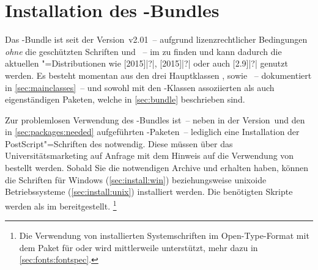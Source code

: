 \section{Installation des \TUDScript-Bundles}
%
%
%
%
%
Das \TUDScript-Bundle ist seit der Version~v2.01~-- aufgrund lizenzrechtlicher 
Bedingungen \emph{ohne} die geschützten Schriften \Univers und \DIN~-- im \CTAN
zu finden und kann dadurch die aktuellen "=Distributionen wie 
[2015]|?|, 
[2015]|?| oder auch
[2.9]|?| genutzt werden. Es besteht momentan aus 
den drei Hauptklassen ,  sowie 
~-- dokumentiert in \autoref{sec:mainclasses}~-- und sowohl 
mit den \TUDScript-Klassen assoziierten als auch eigenständigen Paketen, welche 
in \autoref{sec:bundle} beschrieben sind.

Zur problemlosen Verwendung des \TUDScript-Bundles ist~-- neben \KOMAScript{} in
der Version~\vKOMAScript und den in \autoref{sec:packages:needed} aufgeführten 
-Paketen~-- lediglich eine Installation der PostScript"=Schriften 
des \TUDCDs notwendig. Diese müssen über das Universitätsmarketing auf 
%
{Anfrage} mit dem Hinweis auf die Verwendung von  bestellt 
werden. Sobald Sie die notwendigen Archive  und 
 erhalten haben, können die Schriften für Windows 
(\autoref{sec:install:win}) beziehungsweise unixoide Betriebssysteme 
(\autoref{sec:install:unix}) installiert werden. Die benötigten Skripte 
werden als  
im \GitHubRepo* bereitgestellt.%
\footnote{%
  Die Verwendung von installierten Systemschriften im Open-Type-Format mit dem 
  Paket  für  oder  wird 
  mittlerweile unterstützt, mehr dazu in \autoref{sec:fonts:fontspec}.%
}



